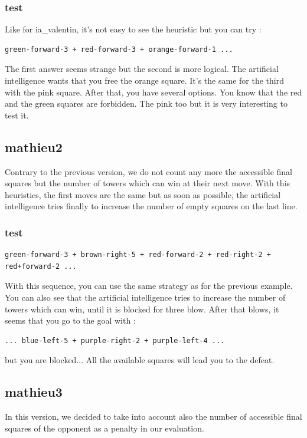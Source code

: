\documentclass[a4paper, 11pt]{article}
\begin{document}
\subsubsection{test}
Like for ia\_valentin, it's not easy to see the heuristic but you can try :
\begin{verbatim}
green-forward-3 + red-forward-3 + orange-forward-1 ...
\end{verbatim}
The first answer seems strange but the second is more logical. The artificial intelligence wants that you free the orange square. It's the same for the third with the pink square.
After that, you have several options. You know that the red and the green squares are forbidden. The pink too but it is very interesting to test it.

\subsection{mathieu2}
Contrary to the previous version, we do not count any more the accessible final squares but the number of towers which can win at their next move. 
With this heuristics, the first moves are the same but as soon as possible, the artificial intelligence tries finally to increase the number of empty squares on the last line.

\subsubsection{test}
\begin{verbatim}
green-forward-3 + brown-right-5 + red-forward-2 + red-right-2 + red+forward-2 ...
\end{verbatim}
With this sequence, you can use the same strategy as for the previous example. You can also see that the artificial intelligence tries to increase the number of towers which can win, until it is blocked for three blow.
After that blows, it seems that you go to the goal with : 
\begin{verbatim}
... blue-left-5 + purple-right-2 + purple-left-4 ...
\end{verbatim}
but you are blocked... All the available squares will lead you to the defeat.

\subsection{mathieu3}
In this version, we decided to take into account also the number of accessible final squares of the opponent as a penalty in our evaluation.
\end{document}

